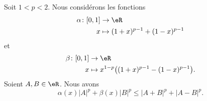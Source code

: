 	\begin{lemma}     \label{LEMooWIPYooMZqjbn}
		Soit \( 1<p<2\). Nous considérons les fonctions
		\begin{equation}
			\begin{aligned}
				\alpha\colon \mathopen[ 0 , 1 \mathclose] & \to \eR                         \\
				x                                         & \mapsto (1+x)^{p-1}+(1-x)^{p-1}
			\end{aligned}
		\end{equation}
		et
		\begin{equation}
			\begin{aligned}
				\beta\colon \mathopen[ 0 , 1 \mathclose] & \to \eR                                             \\
				x                                        & \mapsto x^{1-p}\big( (1+x)^{p-1}-(1-x)^{p-1} \big).
			\end{aligned}
		\end{equation}
		Soient \( A,B\in \eR\). Nous avons
		\begin{equation}
			\alpha(x)| A |^p+\beta(x)| B |^p\leq | A+B |^p+| A-B |^p.
		\end{equation}
	\end{lemma}

